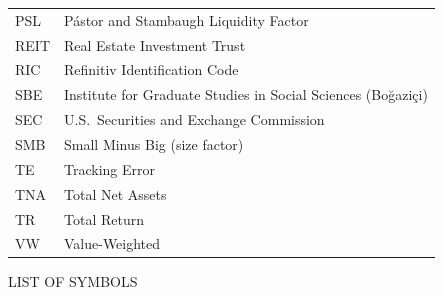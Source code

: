 \documentclass[12pt, oneside]{report}
\newif\ifsbeplainlist   %
\begin{document}
\begin{longtable}{@{}ll@{}}
PSL       & Pástor and Stambaugh Liquidity Factor \\
REIT      & Real Estate Investment Trust \\
RIC       & Refinitiv Identification Code \\
SBE       & Institute for Graduate Studies in Social Sciences (Boğaziçi) \\
SEC       & U.S.\ Securities and Exchange Commission \\
SMB       & Small Minus Big (size factor) \\
TE        & Tracking Error \\
TNA       & Total Net Assets \\
TR        & Total Return \\
VW        & Value-Weighted \\
\end{longtable}
\addtocounter{table}{-1}   %
\sbeplainlistfalse

\clearpage

\thispagestyle{plain}
\begin{center}
LIST OF SYMBOLS
\end{center}

\vspace{12pt}
\end{document}
